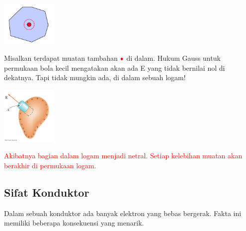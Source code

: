 \documentclass[twocolumn, 11pt]{article}%
\begin{document}
    \begin{center}
        \includegraphics[width=100px]{16.png}
    \end{center}

    Misalkan terdapat muatan tambahan $\color{red}\bullet$ di dalam. Hukum Gauss untuk permukaan bola kecil mengatakan akan ada E yang tidak bernilai nol di dekatnya. Tapi tidak mungkin ada, di dalam sebuah logam!

    \begin{center}
        \includegraphics[width=100px]{17.png}
    \end{center}

    \textcolor{red}{Akibatnya bagian dalam logam menjadi netral. Setiap kelebihan muatan akan berakhir di permukaan logam.}

    \subsection{Sifat Konduktor}%
    Dalam sebuah konduktor ada banyak elektron yang bebas bergerak. Fakta ini memiliki beberapa konsekuensi yang menarik.
\end{document}
